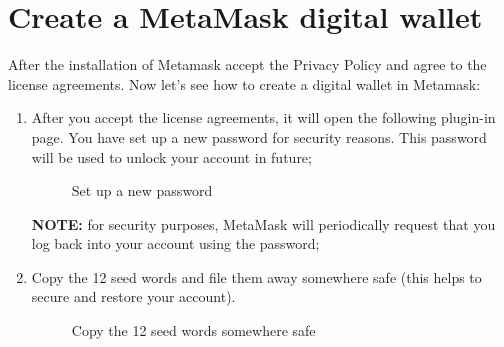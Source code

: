 \documentclass[ManualeUtente]{subfiles}
\begin{document}
\section{Create a MetaMask digital wallet}
After the installation of Metamask accept the Privacy Policy and agree to the license agreements. Now let's see how to create a digital wallet in Metamask:
\begin{enumerate}	
	\item After you accept the license agreements, it will open the following plugin-in page. You have set up a new password for security reasons. This password will be used to unlock your account in future;
	\begin{figure}[H]
		\centering
		\caption{Set up a new password}
		\label{fig:Set up a new password}
	\end{figure}
	\textbf{NOTE:} for security purposes, MetaMask will periodically request that you log back into your account using the password;
	\item Copy the 12 seed words and file them away somewhere safe (this helps to secure and restore your account).
	\begin{figure}[H]
		\centering
		\caption{Copy the 12 seed words somewhere safe}
		\label{fig:Copy the 12 seed words somewhere safe}
	\end{figure}
\end{enumerate}
\newpage
\end{document}
